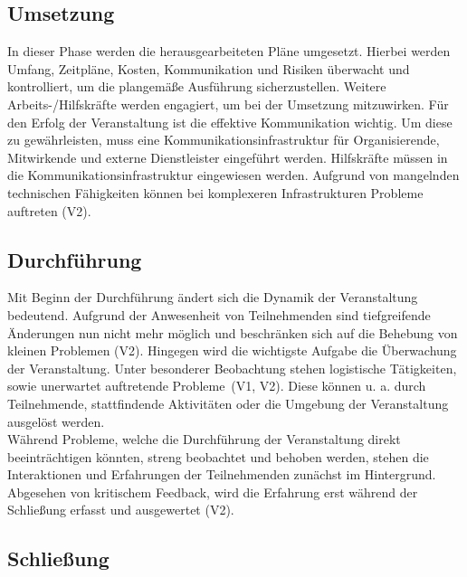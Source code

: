 \subsection{Umsetzung} \label{ssec:analysis-org-umsetzung}

In dieser Phase werden die herausgearbeiteten Pläne umgesetzt. Hierbei werden
Umfang, Zeitpläne, Kosten, Kommunikation und Risiken überwacht und kontrolliert,
um die plangemäße Ausführung sicherzustellen. Weitere Arbeits-/Hilfskräfte
werden engagiert, um bei der Umsetzung mitzuwirken. Für den Erfolg der
Veranstaltung ist die effektive Kommunikation wichtig. Um diese zu
gewährleisten, muss eine Kommunikationsinfrastruktur für Organisierende,
Mitwirkende und externe Dienstleister eingeführt werden. Hilfskräfte müssen in
die Kommunikationsinfrastruktur eingewiesen werden. Aufgrund von mangelnden
technischen Fähigkeiten können bei komplexeren Infrastrukturen Probleme
auftreten (V2).

\subsection{Durchführung} \label{ssec:analysis-org-durchfuehrung}

Mit Beginn der Durchführung ändert sich die Dynamik der Veranstaltung bedeutend.
Aufgrund der Anwesenheit von Teilnehmenden sind tiefgreifende Änderungen nun
nicht mehr möglich und beschränken sich auf die Behebung von kleinen Problemen
(V2). Hingegen wird die wichtigste Aufgabe die Überwachung der Veranstaltung.
Unter besonderer Beobachtung stehen logistische Tätigkeiten, sowie unerwartet
auftretende Probleme~(V1, V2). Diese können u. a. durch Teilnehmende,
stattfindende Aktivitäten oder die Umgebung der Veranstaltung ausgelöst werden.
\\
Während Probleme, welche die Durchführung der Veranstaltung direkt
beeinträchtigen könnten, streng beobachtet und behoben werden, stehen die
Interaktionen und Erfahrungen der Teilnehmenden zunächst im Hintergrund.
Abgesehen von kritischem Feedback, wird die Erfahrung erst während der
Schließung erfasst und ausgewertet (V2).

\subsection{Schließung} \label{ssec:analysis-org-schliessung}


